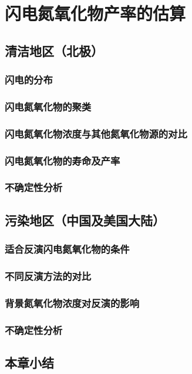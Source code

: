\chapter{闪电氮氧化物产率的估算}

\section{清洁地区（北极）}

\subsection{闪电的分布}
\subsection{闪电氮氧化物的聚类}
\subsection{闪电氮氧化物浓度与其他氮氧化物源的对比}
\subsection{闪电氮氧化物的寿命及产率}
\subsection{不确定性分析}


\section{污染地区（中国及美国大陆）}

\subsection{适合反演闪电氮氧化物的条件}
\subsection{不同反演方法的对比}
\subsection{背景氮氧化物浓度对反演的影响}
\subsection{不确定性分析}

\section{本章小结}
